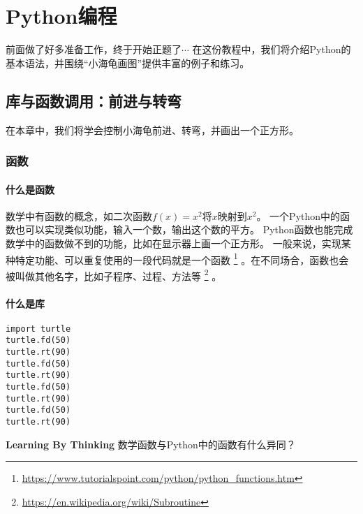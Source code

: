 \part{Python编程}
前面做了好多准备工作，终于开始正题了$\cdots$
在这份教程中，我们将介绍Python的基本语法，并围绕“小海龟画图”提供丰富的例子和练习。
\chapter{库与函数调用：前进与转弯}
在本章中，我们将学会控制小海龟前进、转弯，并画出一个正方形。
\section{函数}
\subsection{什么是函数}
数学中有函数的概念，如二次函数$f(x) = x^2$将$x$映射到$x^2$。
一个Python中的函数也可以实现类似功能，输入一个数，输出这个数的平方。
Python函数也能完成数学中的函数做不到的功能，比如在显示器上画一个正方形。
一般来说，实现某种特定功能、可以重复使用的一段代码就是一个函数
\footnote{\url{https://www.tutorialspoint.com/python/python_functions.htm}}
。在不同场合，函数也会被叫做其他名字，比如子程序、过程、方法等
\footnote{\url{https://en.wikipedia.org/wiki/Subroutine}}
。
\subsection{什么是库}
\begin{lstlisting}[style=PythonStyle1, caption=Snippet title]
import turtle
turtle.fd(50)
turtle.rt(90)
turtle.fd(50)
turtle.rt(90)
turtle.fd(50)
turtle.rt(90)
turtle.fd(50)
turtle.rt(90)
\end{lstlisting}
\begin{paperbox}{\textbf{Learning By Thinking\starthree}}
数学函数与Python中的函数有什么异同？
\end{paperbox}
